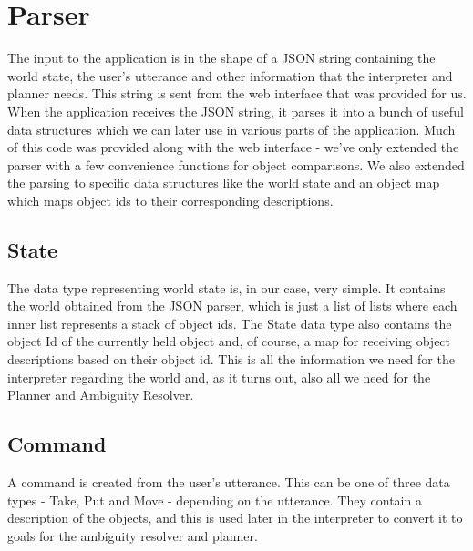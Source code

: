 \section*{Parser}
The input to the application is in the shape of a JSON string containing the world state, the user's utterance and other information that the interpreter and planner needs.
This string is sent from the web interface that was provided for us.
When the application receives the JSON string, it parses it into a bunch of useful data structures which we can later use in various parts of the application.
Much of this code was provided along with the web interface - we've only extended the parser with a few convenience functions for object comparisons.
We also extended the parsing to specific data structures like the world state and an object map which maps object ids to their corresponding descriptions.

\subsection*{State}
The data type representing world state is, in our case, very simple.
It contains the world obtained from the JSON parser, which is just a list of lists where each inner list represents a stack of object ids.
The State data type also contains the object Id of the currently held object and, of course, a map for receiving object descriptions based on their object id. This is all the information we need for the interpreter regarding the world and, as it turns out, also all we need for the Planner and Ambiguity Resolver.

\subsection*{Command}
A command is created from the user's utterance. This can be one of three data types - Take, Put and Move - depending on the utterance.
They contain a description of the objects, and this is used later in the interpreter to convert it to goals for the ambiguity resolver and planner.
